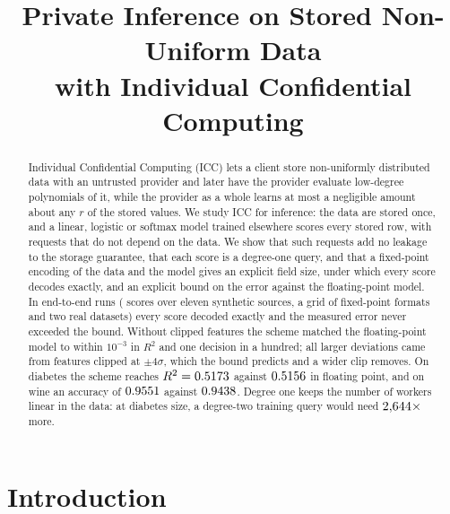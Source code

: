 \documentclass[conference]{IEEEtran}
\theoremstyle{remark}
\begin{document}
\title{Private Inference on Stored Non-Uniform Data\\ with Individual Confidential Computing}

\author{
}

\maketitle

\begin{abstract}
Individual Confidential Computing (ICC) lets a client store non-uniformly distributed data
with an untrusted provider and later have the provider evaluate low-degree polynomials of
it, while the provider as a whole learns at most a negligible amount about any $r$ of the
stored values. We study ICC for inference: the data are stored once, and a linear,
logistic or softmax model trained elsewhere scores every stored row, with requests that do
not depend on the data. We show that such requests add no leakage to the storage
guarantee, that each score is a degree-one query, and that a fixed-point encoding of the
data and the model gives an explicit field size, under which every score decodes exactly,
and an explicit bound on the error against the floating-point model. In \NRuns{}
end-to-end runs (\NScores{} scores over eleven synthetic sources, a grid of fixed-point
formats and two real datasets) every score decoded exactly and the measured error never
exceeded the bound. Without clipped features the scheme matched the floating-point model
to within $10^{-3}$ in $R^2$ and one decision in a hundred; all larger deviations came from
features clipped at $\pm4\sigma$, which the bound predicts and a wider clip removes. On
diabetes the scheme reaches $R^2=0.5173$ against $0.5156$ in floating point, and
on wine an accuracy of $0.9551$ against $0.9438$. Degree one keeps the number of
workers linear in the data: at diabetes size, a degree-two training query would need
$2{,}644\times$ more.
\end{abstract}

\section{Introduction}
\end{document}
